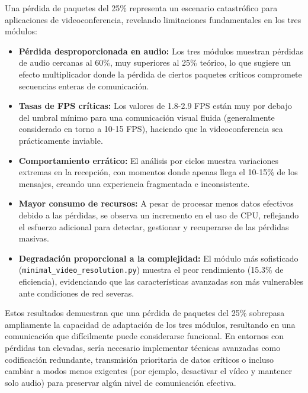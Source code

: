 Una pérdida de paquetes del 25\% representa un escenario catastrófico para aplicaciones de videoconferencia, revelando limitaciones fundamentales en los tres módulos:

\begin{itemize}
    \item \textbf{Pérdida desproporcionada en audio:} Los tres módulos muestran pérdidas de audio cercanas al 60\%, muy superiores al 25\% teórico, lo que sugiere un efecto multiplicador donde la pérdida de ciertos paquetes críticos compromete secuencias enteras de comunicación.
    
    \item \textbf{Tasas de FPS críticas:} Los valores de 1.8-2.9 FPS están muy por debajo del umbral mínimo para una comunicación visual fluida (generalmente considerado en torno a 10-15 FPS), haciendo que la videoconferencia sea prácticamente inviable.
    
    \item \textbf{Comportamiento errático:} El análisis por ciclos muestra variaciones extremas en la recepción, con momentos donde apenas llega el 10-15\% de los mensajes, creando una experiencia fragmentada e inconsistente.
    
    \item \textbf{Mayor consumo de recursos:} A pesar de procesar menos datos efectivos debido a las pérdidas, se observa un incremento en el uso de CPU, reflejando el esfuerzo adicional para detectar, gestionar y recuperarse de las pérdidas masivas.
    
    \item \textbf{Degradación proporcional a la complejidad:} El módulo más sofisticado (\texttt{minimal\_video\_resolution.py}) muestra el peor rendimiento (15.3\% de eficiencia), evidenciando que las características avanzadas son más vulnerables ante condiciones de red severas.
\end{itemize}

Estos resultados demuestran que una pérdida de paquetes del 25\% sobrepasa ampliamente la capacidad de adaptación de los tres módulos, resultando en una comunicación que difícilmente puede considerarse funcional. En entornos con pérdidas tan elevadas, sería necesario implementar técnicas avanzadas como codificación redundante, transmisión prioritaria de datos críticos o incluso cambiar a modos menos exigentes (por ejemplo, desactivar el vídeo y mantener solo audio) para preservar algún nivel de comunicación efectiva.

\newpage

